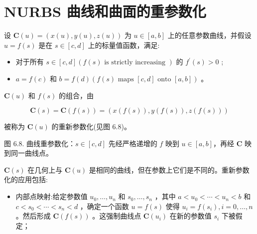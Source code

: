 \documentclass[../main.tex]{subfiles}
\begin{document}
\section{NURBS 曲线和曲面的重参数化}

设 \(\mathbf{C}\left( u\right)  = \left( {x\left( u\right) ,y\left( u\right) ,z\left( u\right) }\right)\) 为 \(u \in  \left\lbrack  {a,b}\right\rbrack\) 上的任意参数曲线，并假设 \(u = f\left( s\right)\) 是在 \(s \in  \left\lbrack  {c,d}\right\rbrack\) 上的标量值函数，满足:

\begin{itemize}
\item 对于所有 \(s \in  \left\lbrack  {c,d}\right\rbrack  \left( {f\left( s\right) \text{ is strictly increasing }}\right)\) 的 \({f}^{\prime }\left( s\right)  > 0\) ;
\end{itemize}

\begin{itemize}
\item \(a = f\left( c\right)\) 和 \(b = f\left( d\right) \left( {f\left( s\right) \text{ maps }\left\lbrack  {c,d}\right\rbrack  \text{ onto }\left\lbrack  {a,b}\right\rbrack  }\right)\) 。
\end{itemize}

\(\mathbf{C}\left( u\right)\) 和 \(f\left( s\right)\) 的组合，由

\[
\mathbf{C}\left( s\right)  = \mathbf{C}\left( {f\left( s\right) }\right)  = \left( {x\left( {f\left( s\right) }\right) ,y\left( {f\left( s\right) }\right) ,z\left( {f\left( s\right) }\right) }\right)
\]

被称为 \(\mathbf{C}\left( u\right)\) 的重新参数化(见图 6.8)。

\begin{center}
\begin{minipage}{18cm}
\vspace*{.6\baselineskip}
\centering
{}
\par\smallskip
图 6.8. 曲线重参数化：$s\in[c,d]$ 先经严格递增的 $f$ 映到 $u\in[a,b]$，再经 $\mathbf C$ 映到同一曲线点。
\end{minipage}
\end{center}

\(\mathbf{C}\left( s\right)\) 在几何上与 \(\mathbf{C}\left( u\right)\) 是相同的曲线，但在参数上它们是不同的。重新参数化的应用包括:

\begin{itemize}
\item 内部点映射:给定参数值 \({u}_{0},\ldots ,{u}_{n}\) 和 \({s}_{0},\ldots ,{s}_{n}\) ，其中 \(a < {u}_{0} < \cdots  < {u}_{n} < b\) 和 \(c < {s}_{0} < \cdots  < {s}_{n} < d\) ，确定一个函数 \(u = f\left( s\right)\) 使得 \({u}_{i} = f\left( {s}_{i}\right) ,i = 0,\ldots ,n\) 。然后形成 \(\mathbf{C}\left( {f\left( s\right) }\right)\) 。这强制曲线点 \(\mathbf{C}\left( {u}_{i}\right)\) 在新的参数值 \({s}_{i}\) 下被假定；
\end{itemize}
\end{document}
